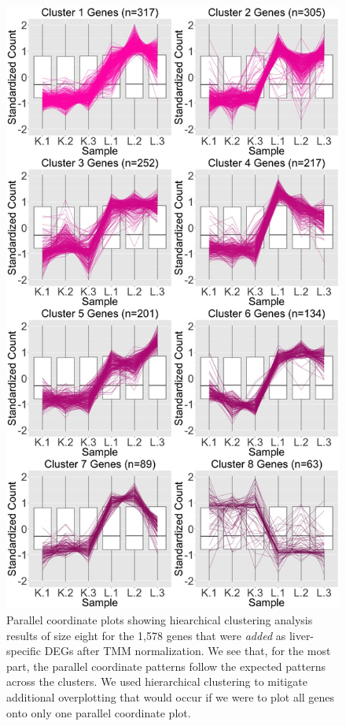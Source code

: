 \documentclass{article}
\begin{document}
\null
\begin{figure}[t!]
\centerline{\includegraphics[width=0.65\columnwidth]{../Bioinformatics/Pictures/liverKidney/Clustering_data_FDR_001_TMMvRaw_Add/K_L_8.jpg}}
\caption{Parallel coordinate plots showing hiearchical clustering analysis results of size eight for the 1,578 genes that were \textit{added} as liver-specific DEGs after TMM normalization. We see that, for the most part, the parallel coordinate patterns follow the expected patterns across the clusters. We used hierarchical clustering to mitigate additional overplotting that would occur if we were to plot all genes onto only one parallel coordinate plot.
\label{AddPCP}}
\end{figure}
\end{document}
